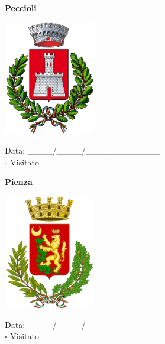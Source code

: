 \documentclass[a5paper,12pt]{article}
\begin{document}
\vspace{0.7cm}

\noindent
\begin{minipage}[t]{0.45\textwidth}
    \begin{center}
        \textbf{Peccioli}
    \end{center}
    \vspace{-0.5cm} %
    \begin{center}
        \includegraphics[height= 5cm, width=4cm]{Toscana/Stemma Peccioli.png}
    \end{center}
    \vspace{-0.4cm} %
    \begin{flushleft}
        Data: \_\_\_\_/\_\_\_\_/\_\_\_\_\_\_\_\_\_\_\_\_ \\
        $\square$ Visitato
    \end{flushleft}
\end{minipage}
\hfill
\noindent
\begin{minipage}[t]{0.45\textwidth}
    \begin{center}
        \textbf{Pienza}
    \end{center}
    \vspace{-0.5cm} %
    \begin{center}
        \includegraphics[height= 5cm, width=4cm]{Toscana/Stemma Pienza.png}
    \end{center}
    \vspace{-0.4cm} %
    \begin{flushleft}
        Data: \_\_\_\_/\_\_\_\_/\_\_\_\_\_\_\_\_\_\_\_\_ \\
        $\square$ Visitato
    \end{flushleft}
\end{minipage}
\end{document}

